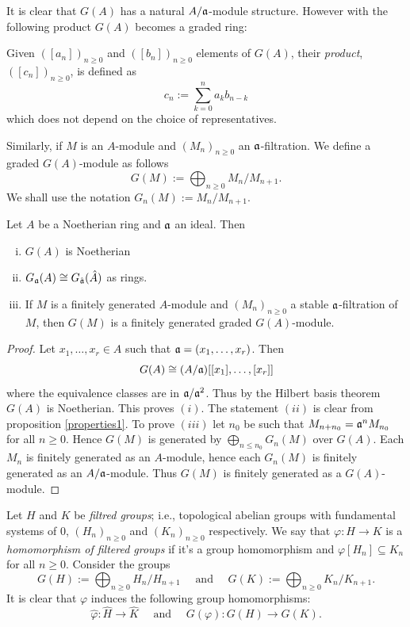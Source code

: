 It is clear that $G(A)$ has a natural $A/\mathfrak{a}$-module structure. However with the following product $G(A)$ becomes a graded ring:
\begin{defi}
    Given $([a_n])_{n\geq 0}$ and $([b_n])_{n\geq 0}$ elements of $G(A)$, their \emph{product}, $([c_n])_{n\geq 0}$, is defined as
    \[
    c_n:=\sum_{k=0}^na_kb_{n-k}
    \]
    which does not depend on the choice of representatives.
\end{defi}

Similarly, if $M$ is an $A$-module and $(M_n)_{n\geq 0}$ an $\mathfrak{a}$-filtration. We define a graded $G(A)$-module as follows
\[
G(M):=\bigoplus_{n\geq 0}M_n/M_{n+1}.
\]
We shall use the notation $G_n(M):=M_n/M_{n+1}$.
\begin{prop}\label{properties1}
    Let $A$ be a Noetherian ring and $\mathfrak{a}$ an ideal. Then
    \begin{enumerate}[(i)]
        \item $G(A)$ is Noetherian
        \item $G_{\mathfrak{a}}(A)\cong G_{\hat{\mathfrak{a}}}(\hat A)$ as rings.
        \item If $M$ is a finitely generated $A$-module and $(M_n)_{n\geq 0}$ a stable $\mathfrak{a}$-filtration of $M$, then $G(M)$ is a finitely generated graded $G(A)$-module.
    \end{enumerate}
\end{prop}
\begin{proof}
    Let $x_1,\dots,x_r\in A$ such that $\mathfrak{a}=(x_1,\dots,x_r)$. Then 
    \[
    G(A)\cong(A/\mathfrak{a})[[x_1],\dots,[x_r]]
    \]
    where the equivalence classes are in $\mathfrak{a}/\mathfrak{a}^2$. Thus by the Hilbert basis theorem $G(A)$ is Noetherian. This proves $(i)$. The statement $(ii)$ is clear from proposition \ref{properties1}. To prove $(iii)$ let $n_0$ be such that $M_{n+n_0}=\mathfrak{a}^nM_{n_0}$ for all $n\geq 0$. Hence $G(M)$ is generated by $\bigoplus_{n\leq n_0}G_n(M)$ over $G(A)$. Each $M_n$ is finitely generated as an $A$-module, hence each $G_n(M)$ is finitely generated as an $A/\mathfrak{a}$-module. Thus $G(M)$ is finitely generated as a $G(A)$-module.
\end{proof}

Let $H$ and $K$ be \emph{filtred groups}; i.e., topological abelian groups with fundamental systems of $0$, $(H_n)_{n\geq 0}$ and $(K_n)_{n\geq 0}$ respectively. We say that $\varphi\colon H \to K$ is a \emph{homomorphism of filtered groups} if it's a group homomorphism and $\varphi[H_n]\subseteq K_n$ for all $n\geq 0$. Consider the groups
\[
G(H):=\bigoplus_{n\geq 0}H_n/H_{n+1} \quad\text{ and }\quad G(K):=\bigoplus_{n\geq 0}K_n/K_{n+1}.
\]
It is clear that $\varphi$ induces the following group homomorphisms:
\[
\hat\varphi\colon \hat H\to \hat K \quad \text{ and }\quad G(\varphi)\colon G(H)\to G(K).
\]


